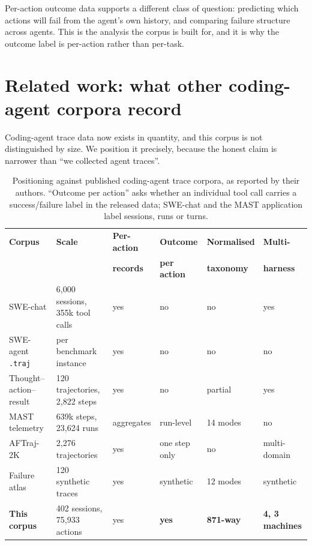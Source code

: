 \documentclass[11pt]{article}
\begin{document}
Per-action outcome data supports a different class of question:
predicting which actions will fail from the agent's own history, and
comparing failure structure across agents. This is the analysis the corpus
is built for, and it is why the outcome label is per-action rather than
per-task.

\section{Related work: what other coding-agent corpora record}
\label{sec:related}

Coding-agent trace data now exists in quantity, and this corpus is not
distinguished by size. We position it precisely, because the honest claim is
narrower than ``we collected agent traces''.

\begin{table}[h]
\centering
\small
\begin{tabular}{llllll}
\toprule
\textbf{Corpus} & \textbf{Scale} & \textbf{Per-action} & \textbf{Outcome} & \textbf{Normalised} & \textbf{Multi-} \\
 & & \textbf{records} & \textbf{per action} & \textbf{taxonomy} & \textbf{harness} \\
\midrule
SWE-chat \cite{baumann2026swechat} & 6{,}000 sessions, 355k tool calls & yes & no & no & yes \\
SWE-agent \texttt{.traj} \cite{yang2024sweagent} & per benchmark instance & yes & no & no & no \\
Thought--action--result \cite{zhang2025tar} & 120 trajectories, 2{,}822 steps & yes & no & partial & yes \\
MAST telemetry \cite{cemri2025mast} & 639k steps, 23{,}624 runs & aggregates & run-level & 14 modes & no \\
AFTraj-2K \cite{zbox2026afraj} & 2{,}276 trajectories & yes & one step only & no & multi-domain \\
Failure atlas & 120 synthetic traces & yes & synthetic & 12 modes & synthetic \\
\midrule
\textbf{This corpus} & 402 sessions, 75{,}933 actions & yes & \textbf{yes} & \textbf{871-way} & \textbf{4, 3 machines} \\
\bottomrule
\end{tabular}
\caption{Positioning against published coding-agent trace corpora, as reported
by their authors. ``Outcome per action'' asks whether an individual tool call
carries a success/failure label in the released data; SWE-chat and the MAST
application label sessions, runs or turns.}
\label{tab:related}
\end{table}
\end{document}
